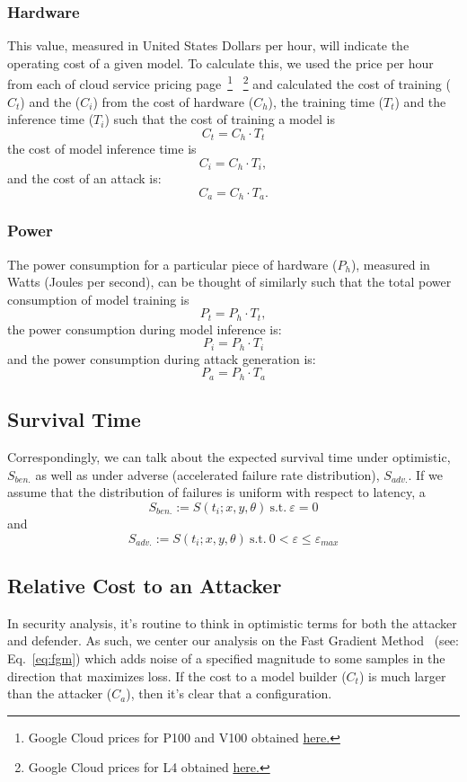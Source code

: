 \documentclass[conference]{IEEEtran}
\begin{document}
\subsubsection{Hardware}
This value, measured in United States Dollars per hour, will indicate the operating cost of a given model. To calculate this, we used the price per hour from each of cloud service pricing page~\footnote{ Google Cloud prices for P100 and V100 obtained \href{https://cloud.google.com/compute/gpus-pricing}{here.} } ~\footnote{Google Cloud prices for L4 obtained  \href{https://cloud.google.com/compute/vm-instance-pricing\#accelerator-optimized}{here.}} and calculated the cost of training ($C_{t}$) and the ($C_{i}$) from the cost of hardware ($C_{h}$), the training time ($T_{t}$) and the inference time ($T_{i}$) such that the cost of training a model is
$$
    C_t = C_h \cdot T_t
    \label{eq:cost_training}
$$
the cost of model inference time is
$$
    C_i = C_h \cdot T_i,
    \label{eq:cost_inference}
$$
and the cost of an attack is:
$$
    C_a = C_h \cdot  T_a.
    \label{eq:cost_attack}
$$

\subsubsection{Power}
The power consumption for a particular piece of hardware ($P_h$), measured in Watts (Joules per second), can be thought of similarly such that the total power consumption of model training is
$$
    P_t = P_h \cdot T_t,
    \label{eq:power_training}
$$
the power consumption during model inference is:
$$
    P_i = P_h \cdot T_i
    \label{eq:power_inference}
$$
and the power consumption during attack generation is:
$$
    P_a = P_h \cdot T_a
    \label{eq:power_attack}
$$

\subsection{Survival Time}
Correspondingly, we can talk about the expected survival time under optimistic, $S_{ben.}$ as well as under adverse (accelerated failure rate distribution), $S_{adv.}$. If we assume that the distribution of failures is uniform with respect to latency, a
$$
S_{ben.} := S(t_i; x, y, \theta) \mathrm{~s.t.~} \varepsilon = 0
$$
and
$$
S_{adv.} :=  S(t_i; x, y, \theta) \mathrm{~s.t.~} 0 < \varepsilon \leq \varepsilon_{max}
$$
\subsection{Relative Cost to an Attacker}
In security analysis, it's routine to think in optimistic terms for both the attacker and defender. As such, we center our analysis on the Fast Gradient Method~\cite{fgm} (see: Eq.~\ref{eq:fgm}) which adds noise of a specified magnitude to some samples in the direction that maximizes loss. If the cost to a model builder ($C_t$) is much larger than the attacker ($C_a$), then it's clear that a configuration. 
\end{document}
